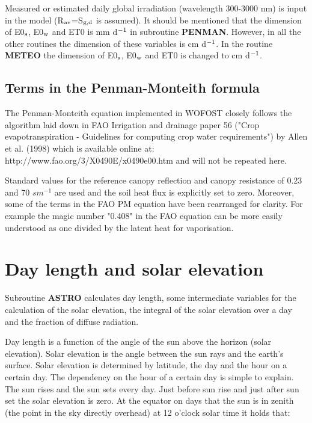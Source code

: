Measured or estimated daily global irradiation (wavelength 300-3000 nm) is input in the
model (R$_{{\rm av}}$=S$_{{\rm g,d}}$ is assumed). It should be mentioned that the dimension of E0$_{{\rm s}}$, E0$_{{\rm w}}$ and ET0 is mm d$^{{\rm -1}}$ in subroutine {\bf PENMAN}. However, in all the other routines the dimension of these variables is cm d$^{{\rm -1}}$. In the routine {\bf METEO} the dimension of E0$_{{\rm s}}$, E0$_{{\rm w}}$ and ET0 is changed to cm d$^{{\rm -1}}$.


\subsection{Terms in the Penman-Monteith formula}

The Penman-Monteith equation implemented in WOFOST closely follows the algorithm laid down in 
FAO Irrigation and drainage paper 56 ("Crop evapotranspiration - Guidelines for computing crop 
water requirements") by Allen et al. (1998) which is available online at: http://www.fao.org/3/X0490E/x0490e00.htm
and will not be repeated here.

Standard values for the reference canopy reflection and canopy resistance of 0.23 and 70 $s m^{-1}$ are used and
the soil heat flux is explicitly set to zero. Moreover, some of the terms in the FAO PM equation have been
rearranged for clarity. For example the magic number "0.408" in the FAO equation can be more easily 
understood as one divided by the latent heat for vaporisation.


\section{Day length and solar elevation}
\label{sec:daylength}

Subroutine {\bf ASTRO} calculates day length, some intermediate variables for the calculation
of the solar elevation, the integral of the solar elevation over a day and the fraction of
diffuse radiation.

Day length is a function of the angle of the sun above the horizon (solar elevation). Solar
elevation is the angle between the sun rays and the earth's surface. Solar elevation is
determined by latitude, the day and the hour on a certain day.
The dependency on the hour of a certain day is simple to explain. The sun rises and the
sun sets every day. Just before sun rise and just after sun set the solar elevation is zero. 
At the equator on days that the sun is in zenith (the point in the sky directly overhead) at 
12 o'clock solar time it holds that:

